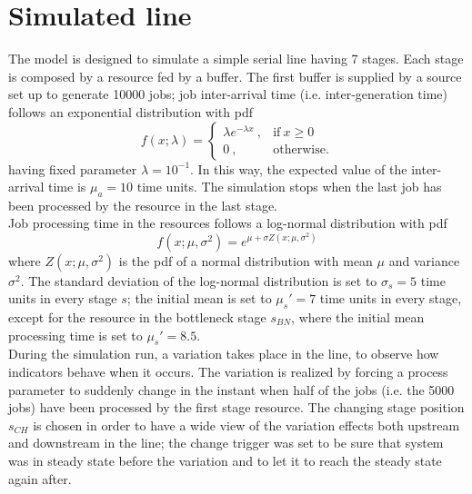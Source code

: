 \section{Simulated line}
The model is designed to simulate a simple serial line having 7 stages. Each stage is composed by a resource fed by a buffer. The first buffer is supplied by a source set up to generate 10000 jobs; job inter-arrival time (i.e. inter-generation time) follows an exponential distribution with pdf
\begin{equation}
f(x;\lambda)=\begin{cases}
\lambda e^{-\lambda x}~,& \text{if}~ x\geq 0\\
0~, & \text{otherwise.}
\end{cases}
\end{equation}
having fixed parameter $\lambda=10^{-1}$. In this way, the expected value of the inter-arrival time is $\mu_{a}=10$ time units. The simulation stops when the last job has been processed by the resource in the last stage.\\ 
Job processing time in the resources follows a log-normal distribution with pdf
\begin{equation}
f(x;\mu,\sigma^2)=e^{\mu+\sigma Z(x;\mu,\sigma^2)}
\end{equation}
where $Z(x;\mu,\sigma^2)$ is the pdf of a normal distribution with mean $\mu$ and variance $\sigma^2$. The standard deviation of the log-normal distribution is set to $\sigma_s=5$ time units in every stage $s$; the initial mean is set to $\mu_s'=7$ time units in every stage, except for the resource in the bottleneck stage $s_{BN}$, where the initial mean processing time is set to $\mu_s'=8.5$.\\
During the simulation run, a variation takes place in the line, to observe how indicators behave when it occurs. The variation is realized by forcing a process parameter to suddenly change in the instant when half of the jobs (i.e. the 5000 jobs) have been processed by the first stage resource. The changing stage position $s_{CH}$ is chosen in order to have a wide view of the variation effects both upstream and downstream in the line; the change trigger was set to be sure that system was in steady state before the variation and to let it to reach the steady state again after.
